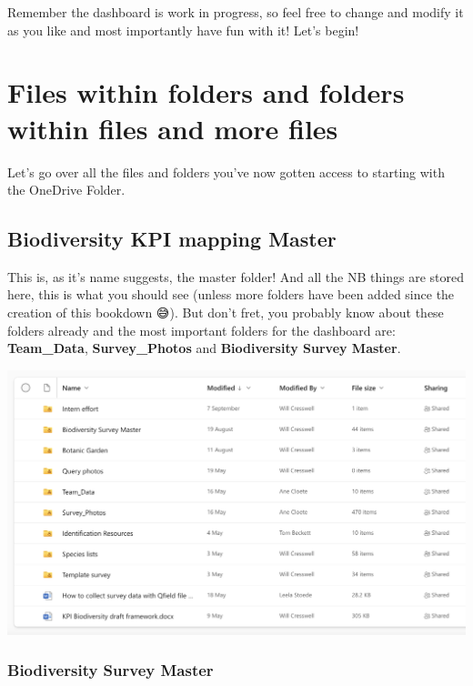 \documentclass[
]{book}
\theoremstyle{definition}
\theoremstyle{definition}
\theoremstyle{definition}
\theoremstyle{definition}
\theoremstyle{remark}
\begin{document}
Remember the dashboard is work in progress, so feel free to change and modify it as you like and most importantly have fun with it! Let's begin!

\hypertarget{files-within-folders-and-folders-within-files-and-more-files}{%
\chapter{Files within folders and folders within files and more files}\label{files-within-folders-and-folders-within-files-and-more-files}}

Let's go over all the files and folders you've now gotten access to starting with the OneDrive Folder.

\hypertarget{biodiversity-kpi-mapping-master}{%
\section{Biodiversity KPI mapping Master}\label{biodiversity-kpi-mapping-master}}

This is, as it's name suggests, the master folder! And all the NB things are stored here, this is what you should see (unless more folders have been added since the creation of this bookdown 😅). But don't fret, you probably know about these folders already and the most important folders for the dashboard are: \textbf{Team\_Data}, \textbf{Survey\_Photos} and \textbf{Biodiversity Survey Master}.

\includegraphics{images/KPI_contents.png}

\hypertarget{biodiversity-survey-master}{%
\subsection{Biodiversity Survey Master}\label{biodiversity-survey-master}}
\end{document}
